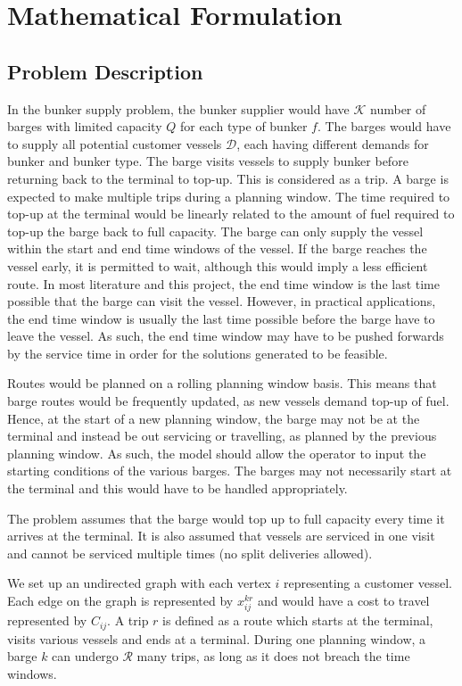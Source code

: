 \chapter{Mathematical Formulation}

\section{Problem Description}
In the bunker supply problem, the bunker supplier would have $\mathcal{K}$ number of barges with limited capacity $Q$ for each type of bunker $f$. The barges would have to supply all potential customer vessels $\mathcal{D}$, each having different demands for bunker and bunker type. The barge visits vessels to supply bunker before returning back to the terminal to top-up. This is considered as a trip. A barge is expected to make multiple trips during a planning window. The time required to top-up at the terminal would be linearly related to the amount of fuel required to top-up the barge back to full capacity. The barge can only supply the vessel within the start and end time windows of the vessel. If the barge reaches the vessel early, it is permitted to wait, although this would imply a less efficient route. In most literature and this project, the end time window is the last time possible that the barge can visit the vessel. However, in practical applications, the end time window is usually the last time possible before the barge have to leave the vessel. As such, the end time window may have to be pushed forwards by the service time in order for the solutions generated to be feasible. \par
Routes would be planned on a rolling planning window basis. This means that barge routes would be frequently updated, as new vessels demand top-up of fuel. Hence, at the start of a new planning window, the barge may not be at the terminal and instead be out servicing or travelling, as planned by the previous planning window. As such, the model should allow the operator to input the starting conditions of the various barges. The barges may not necessarily start at the terminal and this would have to be handled appropriately. \par
The problem assumes that the barge would top up to full capacity every time it arrives at the terminal. It is also assumed that vessels are serviced in one visit and cannot be serviced multiple times (no split deliveries allowed). \par

We set up an undirected graph with each vertex $i$ representing a customer vessel. Each edge on the graph is represented by $x_{ij}^{kr}$ and would have a cost to travel represented by $C_{ij}$. A trip $r$ is defined as a route which starts at the terminal, visits various vessels and ends at a terminal. During one planning window, a barge $k$ can undergo $\mathcal{R}$ many trips, as long as it does not breach the time windows.

